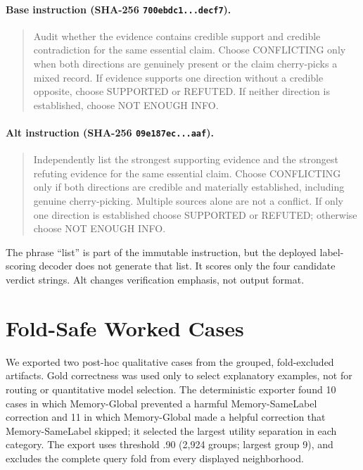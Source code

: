 \documentclass[runningheads]{llncs}
\begin{document}
\paragraph{Base instruction (SHA-256 \texttt{700ebdc1...decf7}).}
\begin{quote}\small
Audit whether the evidence contains credible support and credible
contradiction for the same essential claim. Choose CONFLICTING only when both
directions are genuinely present or the claim cherry-picks a mixed record. If
evidence supports one direction without a credible opposite, choose SUPPORTED
or REFUTED. If neither direction is established, choose NOT ENOUGH INFO.
\end{quote}

\paragraph{Alt instruction (SHA-256 \texttt{09e187ec...aaf}).}
\begin{quote}\small
Independently list the strongest supporting evidence and the strongest
refuting evidence for the same essential claim. Choose CONFLICTING only if
both directions are credible and materially established, including genuine
cherry-picking. Multiple sources alone are not a conflict. If only one
direction is established choose SUPPORTED or REFUTED; otherwise choose NOT
ENOUGH INFO.
\end{quote}

The phrase ``list'' is part of the immutable instruction, but the deployed
label-scoring decoder does not generate that list. It scores only the four
candidate verdict strings. Alt changes verification emphasis, not output format.

\section{Fold-Safe Worked Cases}
\label{sec:worked-cases}

We exported two post-hoc qualitative cases from the grouped, fold-excluded
artifacts. Gold correctness was used only to select explanatory examples, not
for routing or quantitative model selection. The deterministic exporter found
10 cases in which Memory-Global prevented a harmful Memory-SameLabel correction and 11 in
which Memory-Global made a helpful correction that Memory-SameLabel skipped; it selected the
largest utility separation in each category. The export uses threshold .90
(2,924 groups; largest group 9), and excludes the complete query fold from
every displayed neighborhood.
\end{document}
